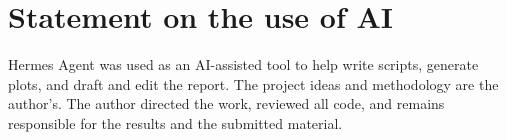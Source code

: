 \documentclass{article}
\begin{document}
\clearpage
\section*{Statement on the use of AI}

Hermes Agent was used as an AI-assisted tool to help write scripts, generate
plots, and draft and edit the report. The project ideas and methodology are the
author's. The author directed the work, reviewed all code, and remains
responsible for the results and the submitted material.




\end{document}
